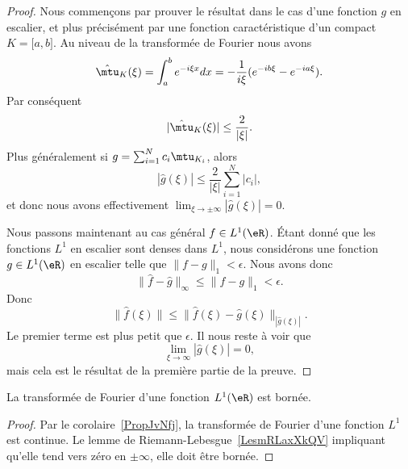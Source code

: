 \begin{proof}
	Nous commençons par prouver le résultat dans le cas d'une fonction \( g\) en escalier, et plus précisément par une fonction caractéristique d'un compact \( K=\mathopen[ a , b \mathclose]\). Au niveau de la transformée de Fourier nous avons
	\begin{equation}
		\hat\mtu_{K}(\xi)=\int_a^b e^{-i\xi x}dx=-\frac{1}{ i\xi }( e^{-ib\xi}- e^{-ia\xi}).
	\end{equation}
	Par conséquent
	\begin{equation}
		| \hat\mtu_K(\xi) |\leq \frac{ 2 }{ | \xi | }.
	\end{equation}
	Plus généralement si \( g=\sum_{i=1}^Nc_i\mtu_{K_i}\), alors
	\begin{equation}
		| \hat g(\xi) |\leq \frac{ 2 }{ | \xi | }\sum_{i=1}^N| c_i |,
	\end{equation}
	et donc nous avons effectivement \( \lim_{\xi\to\pm\infty}| \hat g(\xi) |=0\).

	Nous passons maintenant au cas général \( f\in L^1(\eR)\). Étant donné que les fonctions \( L^1\) en escalier sont denses dans \( L^1\), nous considérons une fonction \( g\in L^1(\eR)\) en escalier telle que \( \| f-g \|_1<\epsilon\). Nous avons donc
	\begin{equation}
		\| \hat f-\hat g \|_{\infty}\leq \| f-g \|_1<\epsilon.
	\end{equation}
	Donc
	\begin{equation}
		\| \hat f(\xi) \|\leq \| \hat f(\xi)-\hat g(\xi) \|_| \hat g(\xi) |.
	\end{equation}
	Le premier terme est plus petit que \( \epsilon\). Il nous reste à voir que
	\begin{equation}
		\lim_{\xi\to \infty} | \hat g(\xi) |=0,
	\end{equation}
	mais cela est le résultat de la première partie de la preuve.
\end{proof}

\begin{corollary}       \label{CORooHSNYooZlZoyV}
	La transformée de Fourier d'une fonction \( L^1(\eR)\) est bornée.
\end{corollary}

\begin{proof}
	Par le corolaire~\ref{PropJvNfj}, la transformée de Fourier d'une fonction \( L^1\) est continue. Le lemme de Riemann-Lebesgue~\ref{LesmRLaxXkQV} impliquant qu'elle tend vers zéro en \( \pm\infty\), elle doit être bornée.
\end{proof}

